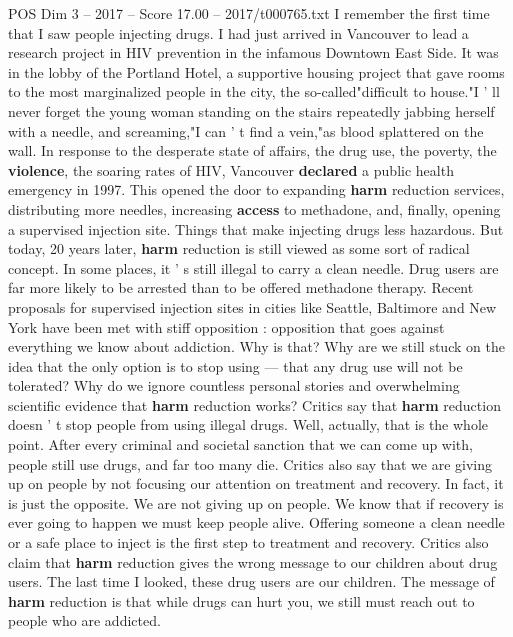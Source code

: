 \begin{textsample}{POS Dim 3 – 2017 – Score 17.00 – 2017/t000765.txt}  \label{ex:f3_pos_012}
I remember the first time that I saw people injecting drugs.
I had just arrived in Vancouver to lead a research project in HIV prevention in the infamous Downtown East Side.
It was in the lobby of the Portland Hotel, a supportive housing project that gave rooms to the most marginalized people in the city, the so-called"difficult to house."I ' ll never forget the young woman standing on the stairs repeatedly jabbing herself with a needle, and screaming,"I can ' t find a vein,"as blood splattered on the wall.
In response to the desperate state of affairs, the drug use, the poverty, the \textbf{violence}, the soaring rates of HIV, Vancouver \textbf{declared} a public health emergency in 1997.
This opened the door to expanding \textbf{harm} reduction services, distributing more needles, increasing \textbf{access} to methadone, and, finally, opening a supervised injection site.
Things that make injecting drugs less hazardous.
But today, 20 years later, \textbf{harm} reduction is still viewed as some sort of radical concept.
In some places, it ' s still illegal to carry a clean needle.
Drug users are far more likely to be arrested than to be offered methadone therapy.
Recent proposals for supervised injection sites in cities like Seattle, Baltimore and New York have been met with stiff opposition : opposition that goes against everything we know about addiction.
Why is that?
Why are we still stuck on the idea that the only option is to stop using — that any drug use will not be tolerated?
Why do we ignore countless personal stories and overwhelming scientific evidence that \textbf{harm} reduction works?
Critics say that \textbf{harm} reduction doesn ' t stop people from using illegal drugs.
Well, actually, that is the whole point.
After every criminal and societal sanction that we can come up with, people still use drugs, and far too many die.
Critics also say that we are giving up on people by not focusing our attention on treatment and recovery.
In fact, it is just the opposite.
We are not giving up on people.
We know that if recovery is ever going to happen we must keep people alive.
Offering someone a clean needle or a safe place to inject is the first step to treatment and recovery.
Critics also claim that \textbf{harm} reduction gives the wrong message to our children about drug users.
The last time I looked, these drug users are our children.
The message of \textbf{harm} reduction is that while drugs can hurt you, we still must reach out to people who are addicted.

\end{textsample}
